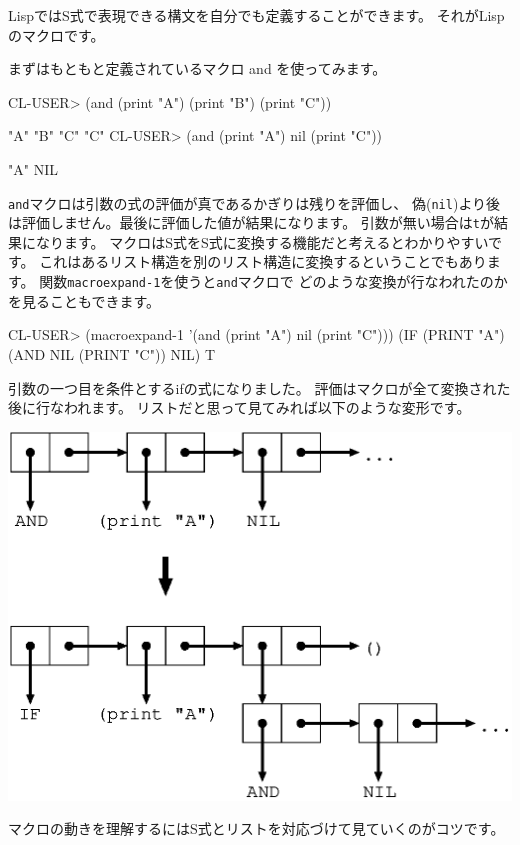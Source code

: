 \documentclass[mingoth,a4paper]{jsarticle}
\begin{document}
LispではS式で表現できる構文を自分でも定義することができます。
それがLispのマクロです。

まずはもともと定義されているマクロ and を使ってみます。

\begin{commandline}
CL-USER> (and (print "A") (print "B") (print "C"))

"A"
"B"
"C"
"C"
CL-USER> (and (print "A") nil (print "C"))

"A"
NIL
\end{commandline}

\verb|and|マクロは引数の式の評価が真であるかぎりは残りを評価し、
偽(\verb|nil|)より後は評価しません。最後に評価した値が結果になります。
引数が無い場合は\verb|t|が結果になります。
マクロはS式をS式に変換する機能だと考えるとわかりやすいです。
これはあるリスト構造を別のリスト構造に変換するということでもあります。
関数\verb|macroexpand-1|を使うと\verb|and|マクロで
どのような変換が行なわれたのかを見ることもできます。

\begin{commandline}
CL-USER> (macroexpand-1 '(and (print "A") nil (print "C")))
(IF (PRINT "A") (AND NIL (PRINT "C")) NIL)
T
\end{commandline}

引数の一つ目を条件とするifの式になりました。
評価はマクロが全て変換された後に行なわれます。
リストだと思って見てみれば以下のような変形です。

\includegraphics[scale=0.5]{image200903/macro.eps}

マクロの動きを理解するにはS式とリストを対応づけて見ていくのがコツです。
\end{document}
